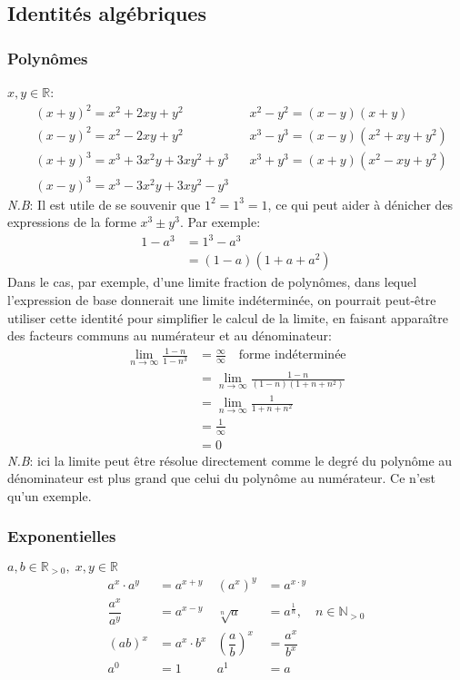 \documentclass{article}
\begin{document}
\subsection{Identités algébriques}
\subsubsection{Polynômes} 
\(x,y \in \mathbb{R}\):
\begin{align*}
	&(x+y)^2 = x^2 + 2xy + y^2 				& 	&x^2 - y^2 = (x - y)(x + y) \\
	&(x-y)^2 = x^2 - 2xy + y^2 					& 	&x^3 - y^3 = (x - y)(x^2 + xy + y^2) \\
	&(x+y)^3 = x^3 + 3x^2y + 3xy^2 + y^3 	& 	&x^3 + y^3 = (x + y)(x^2 - xy + y^2) \\
	&(x-y)^3 = x^3 - 3x^2y + 3xy^2 - y^3 
\end{align*}
\emph{N.B}: Il est utile de se souvenir que \(1^2 = 1^3 = 1\), ce qui peut aider à dénicher des expressions de la forme \(x^3 \pm y^3\). Par exemple:
\vspace{-0.2cm}
\begin{align*}
	1 - a^3 	&= 1^3 - a^3 \\
				&= (1-a)(1+a+a^2)
\end{align*}
Dans le cas, par exemple, d'une limite fraction de polynômes, dans lequel l'expression de base donnerait une limite indéterminée, on pourrait peut-être utiliser cette identité pour simplifier le calcul de la limite, en faisant apparaître des facteurs communs au numérateur et au dénominateur:
\begin{align*}
	\lim_{n \to \infty} \frac{1 - n}{1 - n^3} &= \frac{\infty}{\infty} \quad \text{forme indéterminée} \\
	&= \lim_{n \to \infty} \frac{1 - n}{(1 - n)(1 + n + n^2)} \\
	&= \lim_{n \to \infty} \frac{1}{1 + n + n^2} \\
	&= \frac{1}{\infty} \\
	&= 0
\end{align*}
\emph{N.B}: ici la limite peut être résolue directement comme le degré du polynôme au dénominateur est plus grand que celui du polynôme au numérateur. Ce n'est qu'un exemple.

\subsubsection{Exponentielles}
\(a, b \in \mathbb{R}_{>0}, \; x, y \in \mathbb{R}\)
\begin{align*}
	a^x \cdot a^y 		&= a^{x+y} 			&	(a^x)^y 							&= a^{x \cdot y} \\
	\dfrac{a^x}{a^y} 	&= a^{x-y}  			&	\sqrt[n]{a}						&= a^{\frac1n}, \quad n \in \mathbb{N}_{>0} \\
	(ab)^x 				&= a^x \cdot b^x 	&	\left (\dfrac{a}{b} \right )^x 	&= \dfrac{a^x}{b^x} \\
	a^0 					&= 1 					& 	a^1 								&= a
\end{align*}
\end{document}

